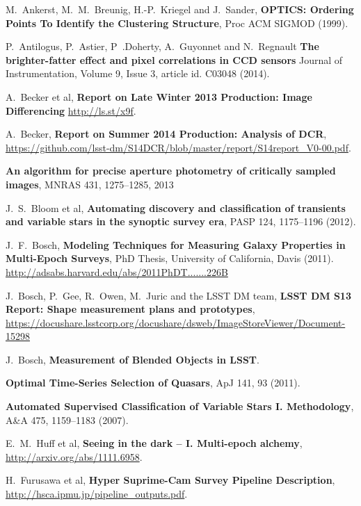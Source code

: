 \documentclass[12pt]{article}
\begin{document}
\clearpage

\begin{thebibliography}{10}

 M.~Ankerst, M.~M.~Breunig, H.-P.~Kriegel and J.~Sander,
  \textbf{OPTICS: Ordering Points To Identify the Clustering Structure},
  Proc ACM SIGMOD (1999).

 P.~Antilogus, P.~Astier, P~.Doherty, A.~Guyonnet and N.~Regnault
  \textbf{The brighter-fatter effect and pixel correlations in CCD sensors}
  Journal of Instrumentation, Volume 9, Issue 3, article id. C03048 (2014).

 A.~Becker et al,
  \textbf{Report on Late Winter 2013 Production: Image Differencing}
  \url{http://ls.st/x9f}.

 A.~Becker,
  \textbf{Report on Summer 2014 Production: Analysis of DCR},
  \url{https://github.com/lsst-dm/S14DCR/blob/master/report/S14report_V0-00.pdf}.

  \textbf{An algorithm for precise aperture photometry of critically sampled images},
  MNRAS 431, 1275--1285, 2013

 J.~S.~Bloom et al,
  \textbf{Automating discovery and classification of transients and variable stars in the synoptic survey era},
  PASP 124, 1175--1196 (2012).

 J.~F.~Bosch,
  \textbf{Modeling Techniques for Measuring Galaxy Properties in Multi-Epoch Surveys},
  PhD Thesis, University of California, Davis (2011). \url{http://adsabs.harvard.edu/abs/2011PhDT.......226B}

 J.~Bosch, P.~Gee, R.~Owen, M.~Juric and the LSST DM team,
  \textbf{LSST DM S13 Report: Shape measurement plans and prototypes},
  \url{https://docushare.lsstcorp.org/docushare/dsweb/ImageStoreViewer/Document-15298}

 J.~Bosch,
  \textbf{Measurement of Blended Objects in LSST}.

  \textbf{Optimal Time-Series Selection of Quasars},
  ApJ 141, 93 (2011).

  \textbf{Automated Supervised Classification of Variable Stars I. Methodology},
  A\&A 475, 1159–1183 (2007).

 E.~M.~Huff et al,
  \textbf{Seeing in the dark -- I. Multi-epoch alchemy},
  \url{http://arxiv.org/abs/1111.6958}.

 H.~Furusawa et al,
  \textbf{Hyper Suprime-Cam Survey Pipeline Description},
  \url{http://hsca.ipmu.jp/pipeline_outputs.pdf}.


\end{thebibliography}
\end{document}
